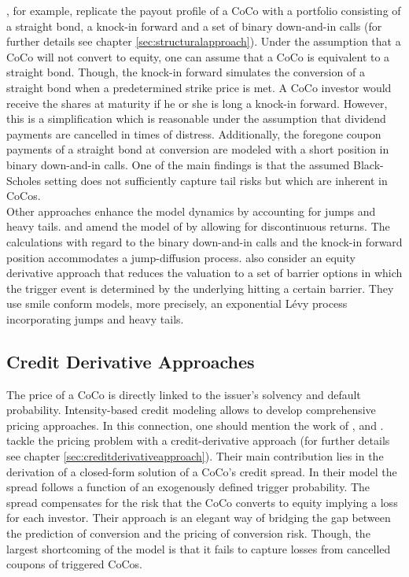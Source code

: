 \citet{de2011pricing}, for example, replicate the payout profile of a CoCo with a portfolio consisting of a straight bond, a knock-in forward and a set of binary down-and-in calls (for further details see chapter \ref{sec:structuralapproach}). Under the assumption that a CoCo will not convert to equity, one can assume that a CoCo is equivalent to a straight bond. Though, the knock-in forward simulates the conversion of a straight bond when a predetermined strike price is met. A CoCo investor would receive the shares at maturity if he or she is long a knock-in forward. However, this is a simplification which is reasonable under the assumption that dividend payments are cancelled in times of distress. Additionally, the foregone coupon payments of a straight bond at conversion are modeled with a short position in binary down-and-in calls. One of the main findings is that the assumed Black-Scholes setting does not sufficiently capture tail risks but which are inherent in CoCos.\\

Other approaches enhance the model dynamics by accounting for jumps and heavy tails. \citet{erismann2015pricing} and \citet{teneberg2012equity} amend the model of \citet{de2011pricing} by allowing for discontinuous returns. The calculations with regard to the binary down-and-in calls and the knock-in forward position accommodates a jump-diffusion process. \citet{corcuera2013pricing} also consider an equity derivative approach that reduces the valuation to a set of barrier options in which the trigger event is determined by the underlying hitting a certain barrier. They use smile conform models, more precisely, an exponential L\'{e}vy process incorporating jumps and heavy tails.

\subsection*{Credit Derivative Approaches}
The price of a CoCo is directly linked to the issuer's solvency and default probability. Intensity-based credit modeling allows to develop comprehensive pricing approaches. In this connection, one should mention the work of \citet{de2011pricing}, \citet{serjantov2011hybrid} and \citet{erismann2015pricing}. \\

\citet{de2011pricing} tackle the pricing problem with a credit-derivative approach (for further details see chapter \ref{sec:creditderivativeapproach}). Their main contribution lies in the derivation of a closed-form solution of a CoCo's credit spread. In their model the spread follows a function of an exogenously defined trigger probability. The spread compensates for the risk that the CoCo converts to equity implying a loss for each investor. Their approach is an elegant way of bridging the gap between the prediction of conversion and the pricing of conversion risk. Though, the largest shortcoming of the model is that it fails to capture losses from cancelled coupons of triggered CoCos.\\

